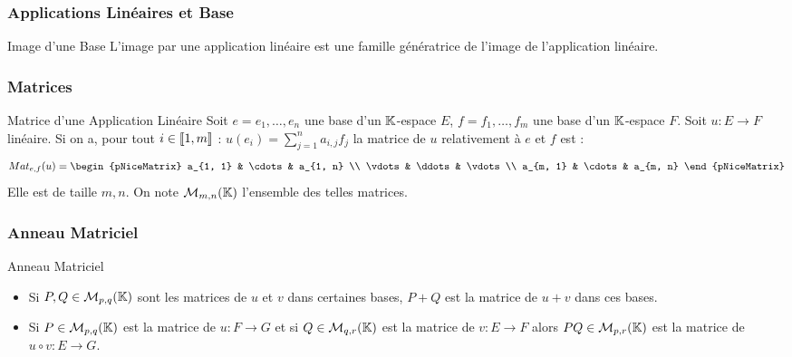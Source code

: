 \documentclass{beamercours}
\begin{document}
\begin{frame}
    \frametitle{Applications Linéaires et Base}
    \begin{propositionfr}{Image d'une Base}{}
        L'image par une application linéaire est une famille génératrice de l'image de l'application linéaire.
    \end{propositionfr}
\end{frame}
\begin{frame}
\frametitle{Matrices}\vspace{-10pt}
\begin{définition}{Matrice d'une Application Linéaire}{}
Soit $e = e_{1}, \ldots, e_{n}$ une base d'un $\mathbb{K}$-espace $E$, $f = f_{1}, \ldots, f_{m}$ une base d'un $\mathbb{K}$-espace $F$. Soit $u : E \to F$ linéaire. Si on a, pour tout $i \in \left\llbracket 1, m\right\rrbracket$ :
$
    u(e_{i}) = \sum_{j = 1}^{n} a_{i, j}f_{j}
$
la matrice de $u$ relativement à $e$ et $f$ est : \vspace{-5pt}
\[
    \mathop{Mat}\nolimits_{e, f}(u) = \begin{pNiceMatrix}
        a_{1, 1} & \cdots & a_{1, n} \\
        \vdots   & \ddots & \vdots   \\
        a_{m, 1} & \cdots & a_{m, n}
    \end{pNiceMatrix}\vspace{-10pt}
\]
Elle est de taille $m, n$. On note $\mathcal{M}_{m, n}(\mathbb{K})$ l'ensemble des telles matrices.
\end{définition}
\end{frame}

\begin{frame}
\frametitle{Anneau Matriciel}
\begin{définition}{Anneau Matriciel}{}
\begin{itemize}
    \item Si $P, Q \in \mathcal{M}_{p, q}(\mathbb{K})$ sont les matrices de $u$ et $v$ dans certaines bases, $P + Q$ est la matrice de $u + v$ dans ces bases.
    \item Si $P \in \mathcal{M}_{p, q}(\mathbb{K})$ est la matrice de $u : F \to G$ et si $Q \in \mathcal{M}_{q, r}(\mathbb{K})$ est la matrice de $v : E \to F$ alors $PQ  \in \mathcal{M}_{p, r}(\mathbb{K})$ est la matrice de $u \circ v : E \to G$.
\end{itemize}
\end{définition}
\end{frame}
\end{document}
